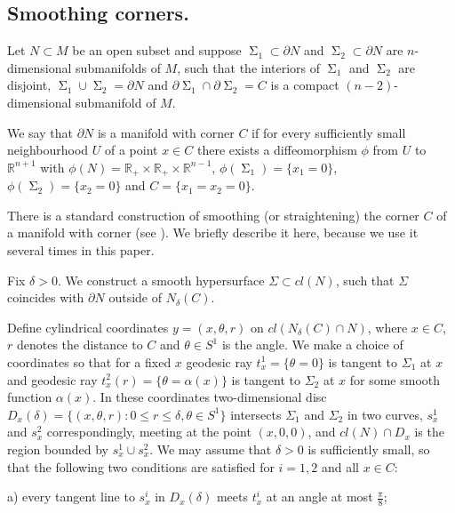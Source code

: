 \documentclass[12pt]{amsart}
\DeclareMathOperator{\Si}{\Sigma}
\theoremstyle{definition}
\begin{document}
\subsection{Smoothing corners.}  \label{smoothing}

Let $N \subset M$ be an open subset
and suppose $\Si_1 \subset \partial N$ and 
$\Si_2 \subset \partial N$ are $n$-dimensional
submanifolds of $M$, such that
the interiors of $\Si_1$ and $\Si_2$ are disjoint,
$\Si_1 \cup \Si_2 = \partial N$ and 
$\partial \Si_1 \cap \partial \Si_2 = C$ is 
a compact $(n-2)$-dimensional submanifold
of $M$.

We say that $\partial N$ is a manifold
with corner $C$ if for every sufficiently
small neighbourhood $U$ of a point $x \in C$
there exists a diffeomorphism $\phi$
from $U$ to $\mathbb{R}^{n+1}$ with
$\phi(N)= \mathbb{R}_+ \times \mathbb{R}_+ \times 
\mathbb{R}^{n-1}$,
$\phi(\Si_1) = \{x_1 = 0 \}$,
$\phi(\Si_2) = \{x_2 = 0 \}$
and $C = \{x_1 = x_2 = 0 \}$.

There is a standard construction
of smoothing (or straightening) the corner 
$C$ of a manifold with corner (see \cite[Section 7.5]{Mu}).
We briefly describe it here,
because we use it several times
in this paper.

Fix $\delta>0$. We construct a smooth hypersurface $\Sigma  \subset cl(N)$,
such that $\Sigma$ coincides with $\partial N$
outside of $N_{\delta}(C)$. 

Define cylindrical coordinates $y=(x, \theta, r)$ on $cl(N_{\delta}(C) \cap N)$,
where $x \in C$, $r$ denotes the distance to $C$ and
$\theta \in S^1$ is the angle. 
We make a choice of coordinates so that for a fixed $x$ 
geodesic ray $t_x^1= \{\theta = 0 \}$ is tangent to $\Sigma_1$ at $x$
and geodesic ray $t_x^2(r) = \{ \theta = \alpha(x)\}$ is tangent to $\Sigma_2$ 
at $x$ for some smooth function $\alpha(x)$.
In these coordinates two-dimensional disc 
$D_x(\delta)=\{(x, \theta, r): 0 \leq r \leq \delta, 
\theta \in S^1\}$ intersects $\Sigma_1$ and $\Sigma_2$ in two curves, 
$s_x^1$ and $s_x^2$ correspondingly, meeting at the point $(x,0,0)$, and $cl(N) \cap D_x$ is 
the region bounded by $s_x^1 \cup s_x^2$.
We may assume that $\delta>0$ is sufficiently small,
so that the following two conditions are satisfied
for $i=1,2$ and all $x \in C$:

a)  every tangent line to $s_x^i$ in $D_x(\delta)$
meets $t_x^i$ at an angle at most $\frac{\pi}{8}$;
\end{document}
